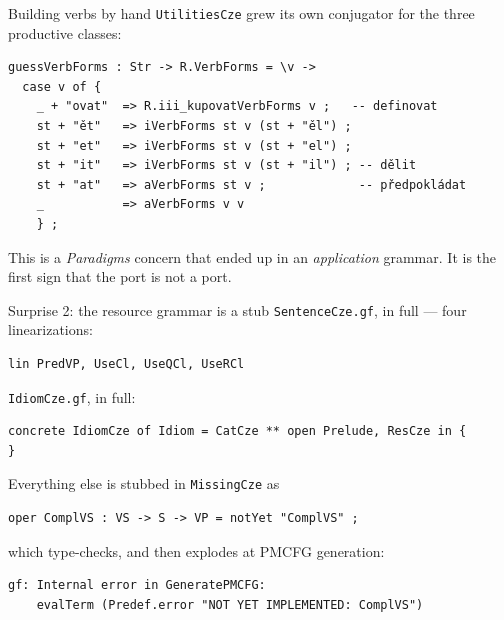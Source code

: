 \documentclass[10pt,aspectratio=169]{beamer}
\begin{document}
\begin{frame}[fragile]{Building verbs by hand}
  \texttt{UtilitiesCze} grew its own conjugator for the three productive classes:

\begin{lstlisting}
guessVerbForms : Str -> R.VerbForms = \v ->
  case v of {
    _ + "ovat"  => R.iii_kupovatVerbForms v ;   -- definovat
    st + "ět"   => iVerbForms st v (st + "ěl") ;
    st + "et"   => iVerbForms st v (st + "el") ;
    st + "it"   => iVerbForms st v (st + "il") ; -- dělit
    st + "at"   => aVerbForms st v ;             -- předpokládat
    _           => aVerbForms v v
    } ;
\end{lstlisting}

  \vspace{0.3em}
  This is a \emph{Paradigms} concern that ended up in an \emph{application} grammar.
  It is the first sign that the port is not a port.
\end{frame}

\begin{frame}[fragile]{Surprise 2: the resource grammar is a stub}
  \texttt{SentenceCze.gf}, in full --- four linearizations:

\begin{lstlisting}
lin PredVP, UseCl, UseQCl, UseRCl
\end{lstlisting}

  \texttt{IdiomCze.gf}, in full:

\begin{lstlisting}
concrete IdiomCze of Idiom = CatCze ** open Prelude, ResCze in {
}
\end{lstlisting}

  \vspace{0.5em}
  Everything else is stubbed in \texttt{MissingCze} as

\begin{lstlisting}
oper ComplVS : VS -> S -> VP = notYet "ComplVS" ;
\end{lstlisting}

  which type-checks, and then explodes at PMCFG generation:

\begin{lstlisting}
gf: Internal error in GeneratePMCFG:
    evalTerm (Predef.error "NOT YET IMPLEMENTED: ComplVS")
\end{lstlisting}
\end{frame}
\end{document}
